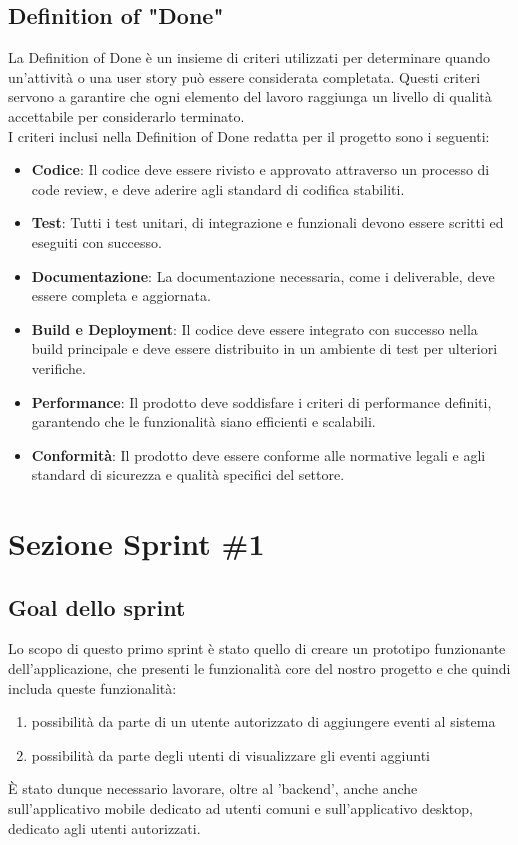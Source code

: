 \documentclass{article}
\begin{document}
\subsection{Definition of "Done"}
La Definition of Done è un insieme di criteri utilizzati per determinare quando un'attività o una user story può essere considerata completata. Questi criteri servono a garantire che ogni elemento del lavoro raggiunga un livello di qualità accettabile per considerarlo terminato.\\
I criteri inclusi nella Definition of Done redatta per il progetto sono i seguenti:
\begin{itemize}
    \item \textbf{Codice}: Il codice deve essere rivisto e approvato attraverso un processo di code review, e deve aderire agli standard di codifica stabiliti.
    \item \textbf{Test}: Tutti i test unitari, di integrazione e funzionali devono essere scritti ed eseguiti con successo.
    \item \textbf{Documentazione}: La documentazione necessaria, come i deliverable, deve essere completa e aggiornata.
    \item \textbf{Build e Deployment}: Il codice deve essere integrato con successo nella build principale e deve essere distribuito in un ambiente di test per ulteriori verifiche.
    \item \textbf{Performance}: Il prodotto deve soddisfare i criteri di performance definiti, garantendo che le funzionalità siano efficienti e scalabili.
    \item \textbf{Conformità}: Il prodotto deve essere conforme alle normative legali e agli standard di sicurezza e qualità specifici del settore. 
\end{itemize}

\clearpage

\section{Sezione Sprint \#1}

\subsection{Goal dello sprint}
Lo scopo di questo primo sprint è stato quello di creare un prototipo funzionante dell'applicazione, che presenti le funzionalità core del nostro progetto e che quindi includa queste funzionalità:
\begin{enumerate}
\item possibilità da parte di un utente autorizzato di aggiungere eventi al sistema
\item possibilità da parte degli utenti di visualizzare gli eventi aggiunti
\end{enumerate}
È stato dunque necessario lavorare, oltre al 'backend', anche anche sull'applicativo mobile dedicato ad utenti comuni e sull'applicativo desktop, dedicato agli utenti autorizzati.
\end{document}
